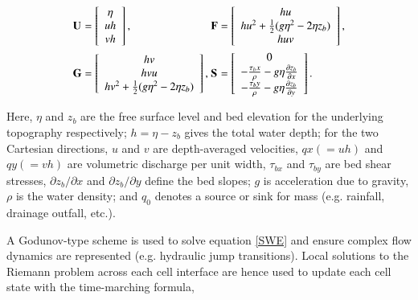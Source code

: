 \documentclass[11pt,english,a4paper]{article}
\begin{document}
\begin{equation}
	\label{SWETerms}
	\begin{alignedat}{4}
		&\textbf U && = \left[ \begin{array}{c}
			\eta \\
			uh \\
			vh
		\end{array} \right] , ~ &&
		\textbf F &&  = \left[ \begin{array}{c}
			hu \\
			hu^2 + \frac{1}{2}(g\eta^2 - 2\eta z_b) \\
			huv
		\end{array} \right] ,\\
		&\textbf G && = \left[ \begin{array}{c}
			hv \\
			hvu \\
			hv^2 + \frac{1}{2}(g\eta^2 - 2\eta z_b) \\
		\end{array} \right] , ~ &&
		\textbf S && = \left[ \begin{array}{c}
			0 \\
			-\frac{\tau_bx}{\rho} - g\eta \frac{\partial z_b}{\partial x} \\
			-\frac{\tau_by}{\rho} - g\eta \frac{\partial z_b}{\partial y} \\
		\end{array} \right] .
	\end{alignedat}
\end{equation}

Here, \(\eta\) and \(z_{b}\) are the free surface level and bed elevation for the underlying topography respectively; \(h = \eta - z_{b}\) gives the total water depth; for the two Cartesian directions, \(u\) and \(v\) are depth-averaged velocities, \(qx (=uh)\) and \(qy (=vh)\) are volumetric discharge per unit width, \(\tau_{bx}\) and \(\tau_{by}\) are bed shear stresses, \(\partial{z_{b}} / \partial{x}\) and \(\partial{z_{b}} / \partial{y}\) define the bed slopes; \(g\) is acceleration due to gravity, \(\rho\) is the water density; and \(q_{0}\) denotes a source or sink for mass (e.g. rainfall, drainage outfall, etc.).

A Godunov-type scheme is used to solve equation \eqref{SWE} and ensure complex flow dynamics are represented (e.g. hydraulic jump transitions). Local solutions to the Riemann problem across each cell interface are hence used to update each cell state with the time-marching formula,
\end{document}
